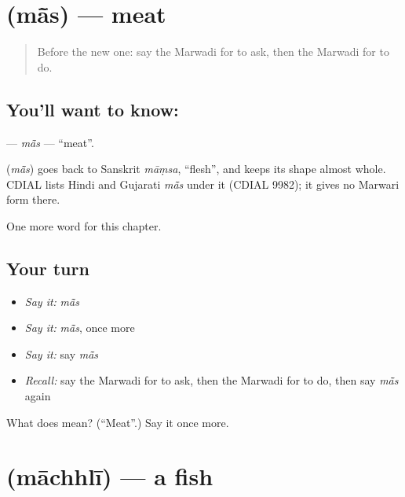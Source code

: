 \section[\texorpdfstring{\mw{मांस} (mā̃s)}{मांस (mā̃s)}]{ (mā̃s) — meat}

\label{lesson:MW-C58-mas}



\begin{quote}
Before the new one: say the Marwadi for to ask, then the Marwadi for to do.
\end{quote}

\subsection*{You'll want to know: }
\textbf{} — \emph{mā̃s} — \textquotedblleft{}meat\textquotedblright{}.

\begin{cousinweb}
\textbf{} (\emph{mā̃s}) goes back to Sanskrit \emph{māṃsa}, \textquotedblleft{}flesh\textquotedblright{}, and keeps its shape almost whole. CDIAL lists Hindi and Gujarati \emph{mā̃s} under it (CDIAL 9982); it gives no Marwari form there.
\end{cousinweb}

\begin{grammarlens}[title={What you've built}]
One more word for this chapter.
\end{grammarlens}

\subsection*{Your turn}
\begin{itemize}
\raggedright
  \item \emph{Say it:} \emph{mā̃s}
  \item \emph{Say it:} \emph{mā̃s}, once more
  \item \emph{Say it:} say \emph{mā̃s}
  \item \emph{Recall:} say the Marwadi for to ask, then the Marwadi for to do, then say \emph{mā̃s} again
\end{itemize}

\begin{tcolorbox}[breakable,colback=teal!4,colframe=teal!35!black,title={Before you move on}]
What does  mean? (\textquotedblleft{}Meat\textquotedblright{}.) Say it once more.
\end{tcolorbox}
\section[\texorpdfstring{\mw{माछली} (māchhlī)}{माछली (māchhlī)}]{ (māchhlī) — a fish}

